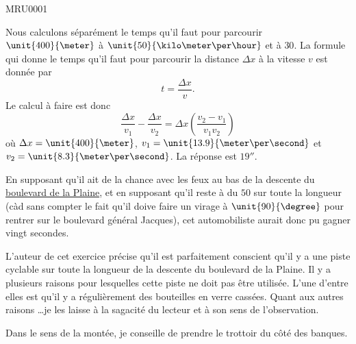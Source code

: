 


\begin{corrige}{MRU0001}

	Nous calculons séparément le temps qu'il faut pour parcourir $\unit{400}{\meter}$ à $\unit{50}{\kilo\meter\per\hour}$ et à $30$. La formule qui donne le temps qu'il faut pour parcourir la distance $\Delta x$ à la vitesse $v$ est donnée par
	\begin{equation}
		t = \frac{ \Delta x }{ v }.
	\end{equation}
	Le calcul à faire est donc
	\begin{equation}
		\frac{ \Delta x }{ v_1 }-\frac{ \Delta x }{ v_2 }=\Delta x\left( \frac{ v_2-v_1 }{ v_1v_2 } \right)
	\end{equation}
	où $\Delta x=\unit{400}{\meter}$, $v_1=\unit{13.9}{\meter\per\second}$ et $v_2=\unit{8.3}{\meter\per\second}$. La réponse est $\unit{19}{\second}$.

	En supposant qu'il ait de la chance avec les feux au bas de la descente du \href{http://www.openstreetmap.org/?lat=50.82012&lon=4.38813&zoom=15&layers=B000FTF}{boulevard de la Plaine}, et en supposant qu'il reste à du $50$ sur toute la longueur (càd sans compter le fait qu'il doive faire un virage à $\unit{90}{\degree}$ pour rentrer sur le boulevard général Jacques), cet automobiliste aurait donc pu gagner vingt secondes.

\end{corrige}

\begin{remark}
	L'auteur de cet exercice précise qu'il est parfaitement conscient qu'il y a une piste cyclable sur toute la longueur de la descente du boulevard de la Plaine. Il y a plusieurs raisons pour lesquelles cette piste ne doit pas être utilisée. L'une d'entre elles est qu'il y a régulièrement des bouteilles en verre cassées. Quant aux autres raisons \ldots je les laisse à la sagacité du lecteur et à son sens de l'observation.

	Dans le sens de la montée, je conseille de prendre le trottoir du côté des banques.
\end{remark}


